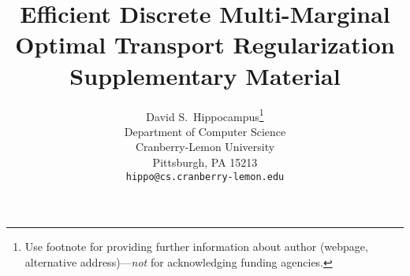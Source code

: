 \documentclass{article}
\title{Efficient Discrete Multi-Marginal \\ Optimal Transport Regularization \\ Supplementary Material}
\author{%
  David S.~Hippocampus\thanks{Use footnote for providing further information
    about author (webpage, alternative address)---\emph{not} for acknowledging
    funding agencies.} \\
  Department of Computer Science\\
  Cranberry-Lemon University\\
  Pittsburgh, PA 15213 \\
  \texttt{hippo@cs.cranberry-lemon.edu} \\
}
\theoremstyle{plain}
\theoremstyle{definition}
\theoremstyle{remark}
\begin{document}
\maketitle

\tableofcontents
%

\newpage







{\small


}
\end{document}

